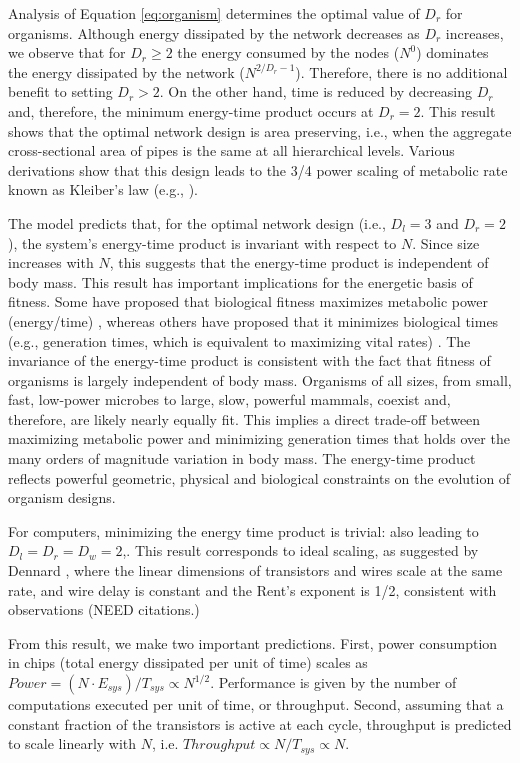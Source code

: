 \documentclass[12pt]{article}
\begin{document}
Analysis of Equation \ref{eq:organism} determines the optimal value of 
$D_r$ for organisms. Although energy dissipated by the network 
decreases as $D_r$ increases, we observe that for $D_r\geq 2$ the 
energy consumed by the nodes ($N^0$) dominates the energy dissipated 
by the network ($N^{2/D_r - 1}$).  Therefore, there is no additional 
benefit to setting $D_r>2$.  On the other hand, time is reduced by 
decreasing $D_r$ and, therefore, the minimum energy-time product 
occurs at $D_r = 2$.  This result shows that the optimal network 
design is area preserving, i.e., when the aggregate cross-sectional 
area of pipes is the same at all hierarchical levels. Various 
derivations show that this design leads to the 3/4 power scaling of 
metabolic rate known as Kleiber's law (e.g., \cite{west97, 
banavar10}).

The model predicts that, for the optimal network design (i.e., $D_l=3$  
and $D_r=2$), the system's energy-time product is invariant with 
respect to $N$.  Since size increases with $N$, this suggests that the 
energy-time product is independent of body mass.   This result has 
important implications for the energetic basis of fitness.  Some have 
proposed that biological fitness maximizes metabolic power 
(energy/time) \cite{lotka56, odum71}, whereas others have proposed 
that it minimizes biological times (e.g., generation times, which is 
equivalent to maximizing vital rates) \cite{lindstedt81, sibly91}. The 
invariance of the energy-time product is consistent with the fact that 
fitness of organisms is largely independent of body mass.  Organisms 
of all sizes, from small, fast, low-power microbes to large, slow, 
powerful mammals, coexist and, therefore, are likely nearly equally 
fit.  This implies a direct trade-off between maximizing metabolic 
power and minimizing generation times that holds over the many orders 
of magnitude variation in body mass.  The energy-time product reflects 
powerful geometric, physical and biological constraints on the 
evolution of organism designs.

For computers, minimizing the energy time product is trivial: 
also leading to $D_l=D_r=D_w = 2$,.  This result corresponds to ideal scaling, as 
suggested by Dennard \cite{dennard74}, where the linear dimensions of 
transistors and wires scale at the same rate, and wire delay is 
constant and the Rent's exponent is 1/2, consistent with observations (NEED citations.)

From this result, we make two important predictions.  First, power consumption in chips (total energy dissipated per 
unit of time) scales as $Power = (N\cdot E_{sys})/T_{sys} \propto 
N^{1/2}$.  Performance is given by the  number of computations 
executed per unit of time, or throughput.  Second, assuming that a constant 
fraction of the transistors is active at each cycle, throughput is 
predicted to scale linearly with $N$,  i.e.  $Throughput\propto 
N/T_{sys} \propto N$.
\end{document}
